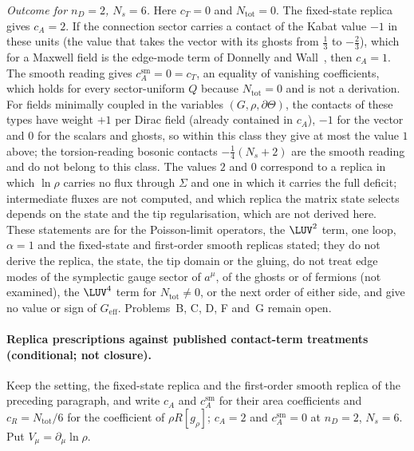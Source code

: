 \emph{Outcome for \(n_D=2\), \(N_s=6\).} Here \(c_T=0\) and \(N_{\mathrm{tot}}=0\). The fixed-state replica gives \(c_A=2\). If the connection sector carries a contact of the Kabat value \(-1\) in these units (the value that takes the vector with its ghosts from \(\tfrac13\) to \(-\tfrac23\)), which for a Maxwell field is the edge-mode term of Donnelly and Wall~\cite{DonnellyWall2016}, then \(c_A=1\). The smooth reading gives \(c_A^{\mathrm{sm}}=0=c_T\), an equality of vanishing coefficients, which holds for every sector-uniform \(Q\) because \(N_{\mathrm{tot}}=0\) and is not a derivation. For fields minimally coupled in the variables \((G,\rho,\partial\Theta)\), the contacts of these types have weight \(+1\) per Dirac field (already contained in \(c_A\)), \(-1\) for the vector and \(0\) for the scalars and ghosts, so within this class they give at most the value \(1\) above; the torsion-reading bosonic contacts \(-\tfrac14(N_s+2)\) are the smooth reading and do not belong to this class. The values \(2\) and \(0\) correspond to a replica in which \(\ln\rho\) carries no flux through \(\Sigma\) and one in which it carries the full deficit; intermediate fluxes are not computed, and which replica the matrix state selects depends on the state and the tip regularisation, which are not derived here. These statements are for the Poisson-limit operators, the \(\LUV^2\) term, one loop, \(\alpha=1\) and the fixed-state and first-order smooth replicas stated; they do not derive the replica, the state, the tip domain or the gluing, do not treat edge modes of the symplectic gauge sector of \(a^\mu\), of the ghosts or of fermions (not examined), the \(\LUV^4\) term for \(N_{\mathrm{tot}}\neq0\), or the next order of either side, and give no value or sign of \(G_{\mathrm{eff}}\). Problems~B, C, D, F and~G remain open.

\paragraph{Replica prescriptions against published contact-term treatments (conditional; not closure).}
Keep the setting, the fixed-state replica and the first-order smooth replica of the preceding paragraph, and write \(c_A\) and \(c_A^{\mathrm{sm}}\) for their area coefficients and \(c_R=N_{\mathrm{tot}}/6\) for the coefficient of \(\rho R[g_\rho]\); \(c_A=2\) and \(c_A^{\mathrm{sm}}=0\) at \(n_D=2\), \(N_s=6\). Put \(V_\mu=\partial_\mu\ln\rho\).

